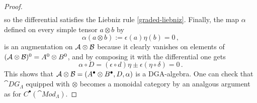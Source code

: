 \begin{prop}
\begin{proof}
\begin{align*}
			\end{align*}
			so the differential satisfies the Liebniz rule \eqref{graded-liebniz}.
			Finally, the map $\alpha$ defined on every simple tensor 
			$a \otimes b$ by
			\begin{equation*}
				\alpha( a \otimes b ) := \epsilon(a)\eta(b) = 0\,,
			\end{equation*}
			is an augmentation on $\mathcal{A} \otimes \mathcal{B}$ because
			it clearly vanishes on elements of $(\mathcal{A} \otimes \mathcal{B})^{0}
			= A^{0} \otimes B^{0}$, and
			by composing it with the differential one gets
			\begin{equation*}
				\alpha \circ D
				= (\epsilon \circ d) \eta
				\pm \epsilon (\eta \circ \delta)
				= 0\,.
			\end{equation*}
			This shows that $\mathcal{A} \otimes \mathcal{B} 
			= (A^{\bullet} \otimes B^{\bullet}, D, \alpha)$
			is a DGA-algebra.
			One can check that $\cat{DG}_{\Lambda}$ equipped with $\otimes$
			becomes a monoidal category by
			an analgous argument as for $C^{\bullet}(\cat{Mod}_{\Lambda})$.
		\end{proof}
	\end{prop}
	

	
	
	
	
	
	
	